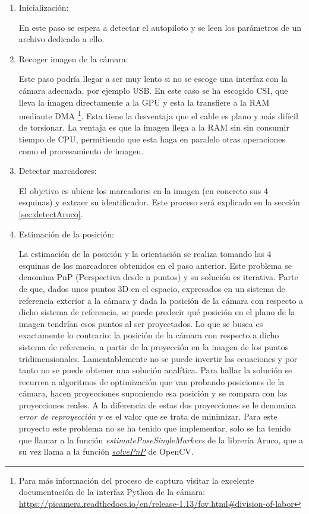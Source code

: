 \begin{enumerate}
\item Inicialización:

	En este paso se espera a detectar el autopiloto y se leen los parámetros de un archivo dedicado a ello.

\item Recoger imagen de la cámara: 

	Este paso podría llegar a ser muy lento si no se escoge una interfaz con la cámara adecuada, por ejemplo USB. En este caso se ha escogido CSI, que lleva la imagen directamente a la GPU y esta la transfiere a la RAM mediante DMA \footnote{Para más información del proceso de captura visitar la excelente documentación de la interfaz Python de la cámara: \url{https://picamera.readthedocs.io/en/release-1.13/fov.html\#division-of-labor}}. Esta tiene la desventaja que el cable es plano y más difícil de torsionar. La ventaja es que la imagen llega a la RAM sin sin consumir tiempo de CPU, permitiendo que esta haga en paralelo otras operaciones como el procesamiento de imagen.

\item Detectar marcadores: 

	El objetivo es ubicar los marcadores en la imagen (en concreto sus 4 esquinas) y extraer su identificador.  Este proceso será explicado en la sección \ref{sec:detectAruco}. 

\item Estimación de la posición:

	La estimación de la posición y la orientación se realiza tomando las 4 esquinas de los marcadores obtenidos en el paso anterior. Este problema se denomina PnP (Perspectiva desde n puntos) y su solución es iterativa. Parte de que, dados unos puntos 3D en el espacio, expresados en un sistema de referencia exterior a la cámara y dada la posición de la cámara con respecto a dicho sistema de referencia, se puede predecir qué posición en el plano de la imagen tendrían esos puntos al ser proyectados. Lo que se busca es exactamente lo contrario: la posición de la cámara con respecto a dicho sistema de referencia, a partir de la proyección en la imagen de los puntos tridimensionales. Lamentablemente no se puede invertir las ecuaciones y por tanto no se puede obtener una solución analítica. Para hallar la solución se recurren a algoritmos de optimización que van probando posiciones de la cámara, hacen proyecciones suponiendo esa posición y se compara con las proyecciones reales. A la diferencia de estas dos proyecciones se le denomina \textit{error de reproyección} y es el valor que se trata de minimizar. Para este proyecto este problema no se ha tenido que implementar, solo se ha tenido que llamar a la función \textit{estimatePoseSingleMarkers} de la librería Aruco, que a su vez llama a la función \href{https://docs.opencv.org/4.5.0/d9/d0c/group\_\_calib3d.html\#ga549c2075fac14829ff4a58bc931c033d}{\textit{solvePnP}} de OpenCV.


\end{enumerate}

